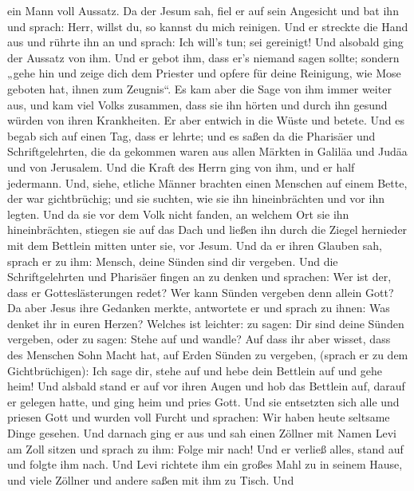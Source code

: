 ein Mann voll Aussatz. Da der Jesum sah, fiel er auf sein Angesicht und
bat ihn und sprach: Herr, willst du, so kannst du mich reinigen.
 Und er streckte die Hand aus und rührte ihn an und sprach:
Ich will's tun; sei gereinigt! Und alsobald ging der Aussatz von ihm.
 Und er gebot ihm, dass er's niemand sagen sollte; sondern
„gehe hin und zeige dich dem Priester und opfere für deine Reinigung,
wie Mose geboten hat, ihnen zum Zeugnis``.  Es kam aber die
Sage von ihm immer weiter aus, und kam viel Volks zusammen, dass sie ihn
hörten und durch ihn gesund würden von ihren Krankheiten. 
Er aber entwich in die Wüste und betete.  Und es begab sich
auf einen Tag, dass er lehrte; und es saßen da die Pharisäer und
Schriftgelehrten, die da gekommen waren aus allen Märkten in Galiläa und
Judäa und von Jerusalem. Und die Kraft des Herrn ging von ihm, und er
half jedermann.  Und, siehe, etliche Männer brachten einen
Menschen auf einem Bette, der war gichtbrüchig; und sie suchten, wie sie
ihn hineinbrächten und vor ihn legten.  Und da sie vor dem
Volk nicht fanden, an welchem Ort sie ihn hineinbrächten, stiegen sie
auf das Dach und ließen ihn durch die Ziegel hernieder mit dem Bettlein
mitten unter sie, vor Jesum.  Und da er ihren Glauben sah,
sprach er zu ihm: Mensch, deine Sünden sind dir vergeben. 
Und die Schriftgelehrten und Pharisäer fingen an zu denken und sprachen:
Wer ist der, dass er Gotteslästerungen redet? Wer kann Sünden vergeben
denn allein Gott?  Da aber Jesus ihre Gedanken merkte,
antwortete er und sprach zu ihnen: Was denket ihr in euren Herzen?
 Welches ist leichter: zu sagen: Dir sind deine Sünden
vergeben, oder zu sagen: Stehe auf und wandle?  Auf dass
ihr aber wisset, dass des Menschen Sohn Macht hat, auf Erden Sünden zu
vergeben, (sprach er zu dem Gichtbrüchigen): Ich sage dir, stehe auf und
hebe dein Bettlein auf und gehe heim!  Und alsbald stand er
auf vor ihren Augen und hob das Bettlein auf, darauf er gelegen hatte,
und ging heim und pries Gott.  Und sie entsetzten sich alle
und priesen Gott und wurden voll Furcht und sprachen: Wir haben heute
seltsame Dinge gesehen.  Und darnach ging er aus und sah
einen Zöllner mit Namen Levi am Zoll sitzen und sprach zu ihm: Folge mir
nach!  Und er verließ alles, stand auf und folgte ihm nach.
 Und Levi richtete ihm ein großes Mahl zu in seinem Hause,
und viele Zöllner und andere saßen mit ihm zu Tisch.  Und
